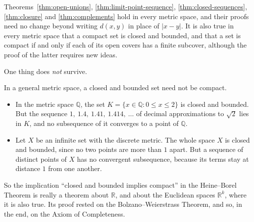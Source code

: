 \begin{marginfigure}
\centering
{}
\caption{An open ball is open.  The point $q$ is at distance $h$ from the rim, so the ball of radius $h$ about $q$ stays inside.}
\end{marginfigure}

  Theorems~\ref{thm:open-unions}, \ref{thm:limit-point-sequence}, \ref{thm:closed-sequences}, \ref{thm:closure} and \ref{thm:complements} hold in every metric space, and their proofs need no change beyond writing $d(x,y)$ in place of $|x - y|$.  It is also true in every metric space that a compact set is closed and bounded, and that a set is compact if and only if each of its open covers has a finite subcover, although the proof of the latter requires new ideas.

One thing does \emph{not} survive.

\begin{dangerousbend}
In a general metric space, a closed and bounded set need not be compact.
\begin{itemize}
	\item In the metric space $\mathbb{Q}$, the set $K = \{x \in \mathbb{Q} : 0 \leq x \leq 2\}$ is closed and bounded.  But the sequence $1,\ 1.4,\ 1.41,\ 1.414,\ \ldots$ of decimal approximations to $\sqrt2$ lies in $K$, and no subsequence of it converges to a point of $\mathbb{Q}$.
	\item Let $X$ be an infinite set with the discrete metric.  The whole space $X$ is closed and bounded, since no two points are more than $1$ apart.  But a sequence of distinct points of $X$ has no convergent subsequence, because its terms stay at distance $1$ from one another.
\end{itemize}
\end{dangerousbend}

So the implication ``closed and bounded implies compact'' in the Heine--Borel Theorem is really a theorem about $\mathbb{R}$, and about the Euclidean spaces $\mathbb{R}^k$, where it is also true.  Its proof rested on the Bolzano--Weierstrass Theorem, and so, in the end, on the Axiom of Completeness.

